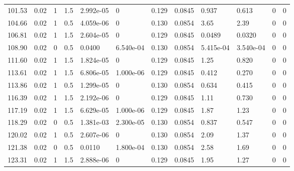\documentclass[preview]{standalone}
\begin{document}
{{\begin{tabular}{L{1.2cm}C{1.2cm} C{0.3cm}C{0.5cm} C{1.4cm}C{1.4cm} C{1.4cm}C{1.4cm} C{1.6cm}C{1.6cm} C{1.6cm}C{1.6cm}}
  101.53  &  0.02  & 1     & 1.5 &  2.992e-05  & 0  &  0.129&   0.0845& 0.937 & 0.613   &  0 & 0  \\ 
  104.66  &  0.02  & 1     & 0.5 &  4.059e-06  & 0  &  0.130&   0.0854& 3.65 & 2.39   &  0 & 0  \\ 
  106.81  &  0.02  & 1     & 1.5 &  2.604e-05  & 0  &  0.129&   0.0845& 0.0489 & 0.0320   &  0 & 0  \\ 
  108.90  &  0.02  & 0     & 0.5 &  0.0400  & 6.540e-04  &  0.130&   0.0854& 5.415e-04 & 3.540e-04   &  0 & 0  \\ 
  111.60  &  0.02  & 1     & 1.5 &  1.824e-05  & 0  &  0.129&   0.0845& 1.25 & 0.820   &  0 & 0  \\ 
  113.61  &  0.02  & 1     & 1.5 &  6.806e-05  & 1.000e-06  &  0.129&   0.0845& 0.412 & 0.270   &  0 & 0  \\ 
  113.86  &  0.02  & 1     & 0.5 &  1.299e-05  & 0  &  0.130&   0.0854& 0.634 & 0.415   &  0 & 0  \\ 
  116.39  &  0.02  & 1     & 1.5 &  2.192e-06  & 0  &  0.129&   0.0845& 1.11 & 0.730   &  0 & 0  \\ 
  117.19  &  0.02  & 1     & 1.5 &  6.629e-05  & 1.000e-06  &  0.129&   0.0845& 1.87 & 1.23   &  0 & 0  \\ 
  118.29  &  0.02  & 0     & 0.5 &  1.381e-03  & 2.300e-05  &  0.130&   0.0854& 0.837 & 0.547   &  0 & 0  \\ 
  120.02  &  0.02  & 1     & 0.5 &  2.607e-06  & 0  &  0.130&   0.0854& 2.09 & 1.37   &  0 & 0  \\ 
  121.38  &  0.02  & 0     & 0.5 &  0.0110  & 1.800e-04  &  0.130&   0.0854& 2.58 & 1.69   &  0 & 0  \\ 
  123.31  &  0.02  & 1     & 1.5 &  2.888e-06  & 0  &  0.129&   0.0845& 1.95 & 1.27   &  0 & 0  \\ 
\hline 
\end{tabular} 

}}
\end{document}
